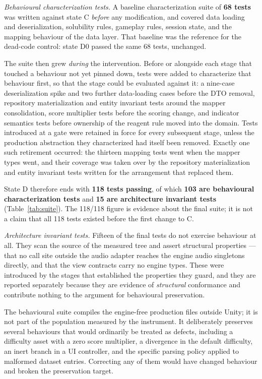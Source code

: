 \documentclass[pdflatex,sn-basic]{sn-jnl}
\begin{document}
\emph{Behavioural characterization tests.} A baseline characterization suite of \textbf{68 tests} was written against state C \emph{before} any modification, and covered data loading and deserialization, solubility rules, gameplay rules, session state, and the mapping behaviour of the data layer. That baseline was the reference for the dead-code control: state D0 passed the same 68 tests, unchanged.

The suite then grew \emph{during} the intervention. Before or alongside each stage that touched a behaviour not yet pinned down, tests were added to characterize that behaviour first, so that the stage could be evaluated against it: a nine-case deserialization spike and two further data-loading cases before the DTO removal, repository materialization and entity invariant tests around the mapper consolidation, score multiplier tests before the scoring change, and indicator semantics tests before ownership of the reagent rule moved into the domain. Tests introduced at a gate were retained in force for every subsequent stage, unless the production abstraction they characterized had itself been removed. Exactly one such retirement occurred: the thirteen mapping tests went when the mapper types went, and their coverage was taken over by the repository materialization and entity invariant tests written for the arrangement that replaced them.

State D therefore ends with \textbf{118 tests passing}, of which \textbf{103 are behavioural characterization tests} and \textbf{15 are architecture invariant tests} (Table~\ref{tab:suite}). The 118/118 figure is evidence about the final suite; it is not a claim that all 118 tests existed before the first change to C.

\emph{Architecture invariant tests.} Fifteen of the final tests do not exercise behaviour at all. They scan the source of the measured tree and assert structural properties --- that no call site outside the audio adapter reaches the engine audio singletons directly, and that the view contracts carry no engine types. These were introduced by the stages that established the properties they guard, and they are reported separately because they are evidence of \emph{structural} conformance and contribute nothing to the argument for behavioural preservation.

The behavioural suite compiles the engine-free production files outside Unity; it is not part of the population measured by the instrument. It deliberately preserves several behaviours that would ordinarily be treated as defects, including a difficulty asset with a zero score multiplier, a divergence in the default difficulty, an inert branch in a UI controller, and the specific parsing policy applied to malformed dataset entries. Correcting any of them would have changed behaviour and broken the preservation target.
\end{document}
